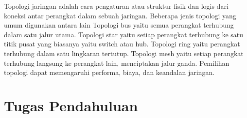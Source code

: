 Topologi jaringan adalah cara pengaturan atau struktur fisik dan logis dari koneksi antar perangkat dalam sebuah jaringan. Beberapa jenis topologi yang umum digunakan antara lain Topologi bus yaitu semua perangkat terhubung dalam satu jalur utama. Topologi star yaitu setiap perangkat terhubung ke satu titik pusat yang biasanya yaitu switch atau hub. Topologi ring yaitu perangkat terhubung dalam satu lingkaran tertutup. Topologi mesh yaitu setiap perangkat terhubung langsung ke perangkat lain, menciptakan jalur ganda.
Pemilihan topologi dapat memengaruhi performa, biaya, dan keandalan jaringan.

\section{Tugas Pendahuluan}
